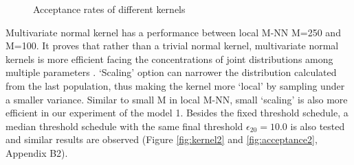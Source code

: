 \documentclass[12pt,a4paper]{report}
\begin{document}
\begin{figure}
    \begin{center}
    \end{center}
    
    \caption[Total required samples of different kernels]%
        {Total required samples of different kernels. Different color represents different generations (bottom to top: generation 1 to generation 20)}
    \label{fig:kernel1}

    \vspace*{\floatsep}

    \begin{center}
    \end{center}
    
    \caption{Acceptance rates of different kernels}
    \label{fig:acceptance1}
    
\end{figure}

Multivariate normal kernel has a performance between local M-NN M=250 and M=100. It proves that rather than a trivial normal kernel, multivariate normal kernels is more efficient facing the concentrations of joint distributions among multiple parameters \cite{ref:kernel}. `Scaling' option can narrower the distribution calculated from the last population, thus making the kernel more `local' by sampling under a smaller variance. Similar to small M in local M-NN, small `scaling' is also more efficient in our experiment of the model 1. Besides the fixed threshold schedule, a median threshold schedule with the same final threshold $\epsilon_{20}=10.0$ is also tested and similar results are observed (Figure \ref{fig:kernel2} and \ref{fig:acceptance2}, Appendix B2).
\end{document}
